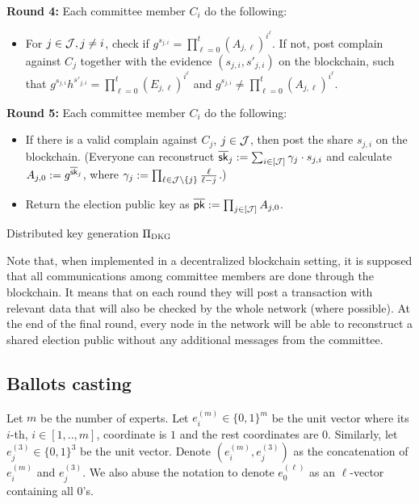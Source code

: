 {\textbf{Round 4:} Each committee member $C_i$ do the following:
\begin{itemize}

\item For $j\in\mathcal{J}, j\neq i$, check if $g^{s_{j,i}}= \prod_{\ell=0}^{t} (A_{j,\ell})^{i^\ell}$. If not, post complain against $C_j$ together with the evidence $(s_{j,i},s'_{j,i})$ on the blockchain, such that $g^{s_{j,i}}h^{s'_{j,i}}= \prod_{\ell=0}^{t} (E_{j,\ell})^{i^\ell}$ and $g^{s_{j,i}}\neq  \prod_{\ell=0}^{t} (A_{j,\ell})^{i^\ell}$.
\end{itemize}

\textbf{Round 5:} Each committee member $C_i$ do the following:
\begin{itemize}
\item If there is a valid complain against $C_j$, $j\in\mathcal{J}$, then post the share $s_{j,i}$ on the blockchain. 
 (Everyone can reconstruct $\overline{\mathsf{sk}}_j := \sum_{i\in[\mathcal{J}]} \gamma_{j} \cdot s_{j,i}$ and calculate $A_{j,0}:= g^{\overline{\mathsf{sk}}_j}$, where $\gamma_{j}:= \prod_{\ell\in \mathcal{J}\setminus \{j\} } \frac{\ell}{\ell-j}$.)

\item Return the election public key as $\overline{\mathsf{pk}} := \prod_{j\in[\mathcal{J}]}  A_{j,0}$.
\end{itemize}
	
}{Distributed key generation $\Pi_{\textsc{DKG}}$\label{fig:DKG}}

Note that, when implemented in a decentralized blockchain setting, it is supposed that all communications among committee members are done through the blockchain. It means that on each round they will post a transaction with relevant data that will also be checked by the whole network (where possible). At the end of the final round, every node in the network will be able to reconstruct a shared election public without any additional messages from the committee. 

\subsection{Ballots casting}

Let $m$ be the number of experts. Let $e^{(m)}_i \in \{0,1\}^{m}$ be the unit vector where its $i$-th, $i \in [1,..,m]$, coordinate is $1$ and the rest coordinates are $0$. Similarly, let  $e^{(3)}_j \in \{0,1\}^{3}$ be the unit vector. Denote $( e^{(m)}_i , e^{(3)}_j )$ as the concatenation of $e^{(m)}_i $ and $e^{(3)}_j$.  We also abuse the notation to denote  $e^{(\ell)}_0$ as an $\ell$-vector containing all $0$'s.  


